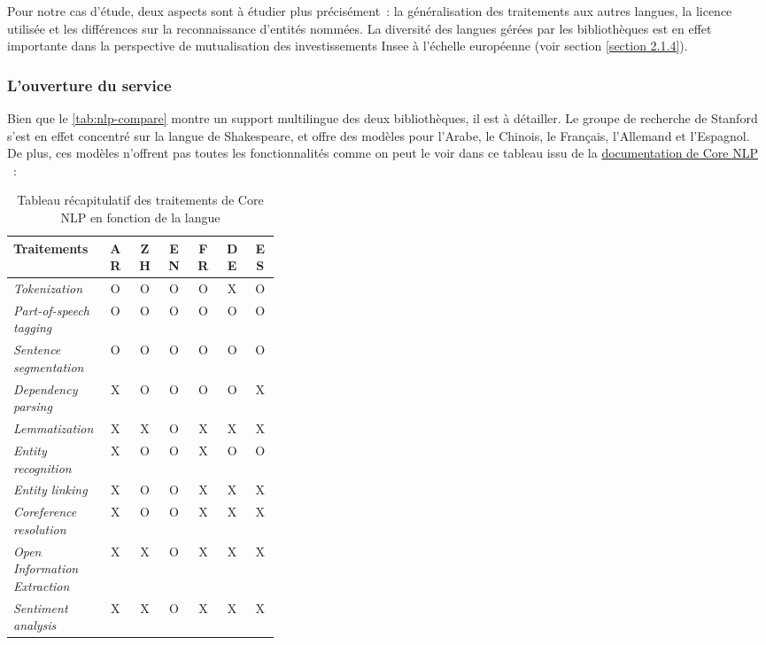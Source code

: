 Pour notre cas d'étude, deux aspects sont à étudier plus précisément~: la généralisation des traitements aux autres langues, la licence utilisée et les différences sur la reconnaissance d'entités nommées. La diversité des langues gérées par les bibliothèques est en effet importante dans la perspective de mutualisation des investissements Insee à l'échelle européenne (voir section \ref{section 2.1.4}). 
\label{section 3.1.2}

\subsubsection{L'ouverture du service}
Bien que le \autoref{tab:nlp-compare} montre un support multilingue des deux bibliothèques, il est à détailler. Le groupe de recherche de Stanford s'est en effet concentré sur la langue de Shakespeare, et offre des modèles pour l'Arabe, le Chinois, le Français, l'Allemand et l'Espagnol. De plus, ces modèles n'offrent pas toutes les fonctionnalités comme on peut le voir dans ce tableau issu de la \href{https://stanfordnlp.github.io/CoreNLP/human-languages.html}{documentation de Core NLP} \cite{corenlp-lang}~:
\vspace{10pt}
\begin{table}[H]
    \centering
    \begin{tabular}{| p{0.35\linewidth} | c | c | c | c | c | c |}
        \hline
        \textbf{Traitements} &AR &ZH &EN &FR &DE &ES\\
        \hline 
        \hline
        \textit{Tokenization} &O &O &O &O &X &O\\
        \hline
        \textit{Part-of-speech tagging} &O &O &O &O &O &O\\		
        \hline 
        \textit{Sentence segmentation} &O &O &O &O &O &O\\
        \hline 
        \textit{Dependency parsing} &X &O &O &O &O &X\\
        \hline
        \textit{Lemmatization} &X &X &O &X &X &X\\
        \hline 
        \textit{Entity recognition} &X &O &O &X &O &O\\
        \hline 
        \textit{Entity linking} &X &O &O &X &X &X\\
        \hline 
        \textit{Coreference resolution} &X &O &O &X &X &X\\
        \hline 
        \textit{Open Information Extraction} &X &X &O &X &X &X\\
        \hline 
        \textit{Sentiment analysis} &X &X &O &X &X &X\\
        \hline
    \end{tabular}
    \caption{Tableau récapitulatif des traitements de Core NLP en fonction de la langue}
    \label{tab:corenlp-lang}
\end{table}
\vspace{10pt}

